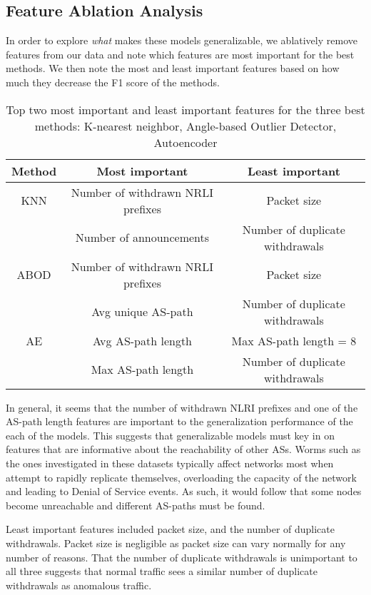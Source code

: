 \subsection{Feature Ablation Analysis}
In order to explore \textit{what} makes these models generalizable, we ablatively remove features from our data and note which features are most important for the best methods. We then note the most and least important features based on how much they decrease the F1 score of the methods. 

\begin{table} [ht!]
\centering
\begin{tabular}{c|c|c}
\toprule
     \textbf{Method} & \textbf{Most important} & \textbf{Least important} \\
     \hline
     KNN & Number of withdrawn NRLI prefixes & Packet size \\
     & Number of announcements  & Number of duplicate withdrawals \\
     \hline
     ABOD & Number of withdrawn NRLI prefixes & Packet size\\
     & Avg unique AS-path & Number of duplicate withdrawals \\
     \hline
     AE & Avg AS-path length & Max AS-path length = 8 \\
     & Max AS-path length & Number of duplicate withdrawals \\
\bottomrule
\end{tabular}
\caption{\label{tab:feats} Top two most important and least important features for the three best methods: K-nearest neighbor, Angle-based Outlier Detector, Autoencoder}
\end{table}

In general, it seems that the number of withdrawn NLRI prefixes and one of the AS-path length features are important to the generalization performance of the each of the models. This suggests that generalizable models must key in on features that are informative about the reachability of other ASs. Worms such as the ones investigated in these datasets typically affect networks most when attempt to rapidly replicate themselves, overloading the capacity of the network and leading to Denial of Service events. As such, it would follow that some nodes become unreachable and different AS-paths must be found. 

Least important features included packet size, and the number of duplicate withdrawals. Packet size is negligible as packet size can vary normally for any number of reasons. That the number of duplicate withdrawals is unimportant to all three suggests that normal traffic sees a similar number of duplicate withdrawals as anomalous traffic.

